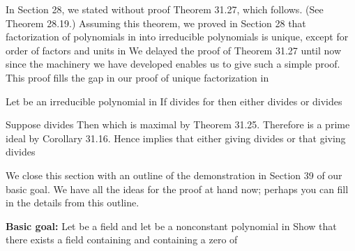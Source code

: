 \documentclass[11pt,oneside]{article}
\begin{document}
\begin{BookBody}

\noindent In Section 28, we stated without proof Theorem 31.27, which follows. (See Theorem 28.19.) Assuming this theorem, we proved in Section 28 that factorization of polynomials in  into irreducible polynomials is unique, except for order of factors and units in  We delayed the proof of Theorem 31.27 until now since the machinery we have developed enables us to give such a simple proof. This proof fills the gap in our proof of unique factorization in 

 Let  be an irreducible polynomial in  If  divides  for   then either  divides  or  divides 

 Suppose  divides  Then  which is maximal by Theorem 31.25. Therefore is a prime ideal by Corollary 31.16. Hence  implies that either  giving  divides  or that  giving  divides \BookEnd{\blacklozenge}


\noindent We close this section with an outline of the demonstration in Section 39 of our basic goal. We have all the ideas for the proof at hand now; perhaps you can fill in the details from this outline.

\textbf{Basic goal:} Let  be a field and let  be a nonconstant polynomial in  Show that there exists a field  containing  and containing a zero \BookInline{\alpha } of 




\end{BookBody}
\end{document}

